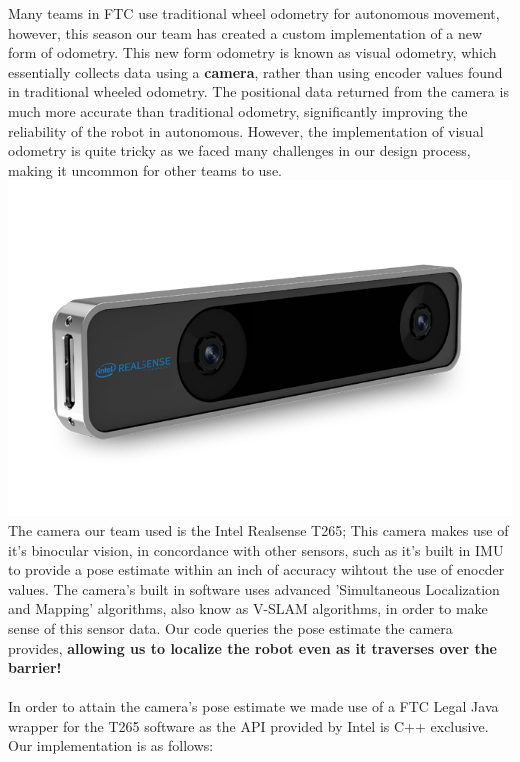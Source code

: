 \documentclass[a4paper,12pt]{article}
\begin{document}
\noindent Many teams in FTC use traditional wheel odometry for autonomous movement, however, this season our team has created a custom implementation of a new form of odometry. This new form odometry is known as visual odometry, which essentially collects data using a \textbf{camera}, rather than using encoder values found in traditional wheeled odometry. The positional data returned from the camera is much more accurate than traditional odometry, significantly improving the reliability of the robot in autonomous. However, the implementation of visual odometry is quite tricky as we faced many challenges in our design process, making it uncommon for other teams to use. 
\\
\includegraphics[width=\textwidth]{t265.png}
The camera our team used is the Intel Realsense T265; This camera makes use of it's binocular vision, in concordance with other sensors, such as it's built in IMU to provide a pose estimate within an inch of accuracy wihtout the use of enocder values. The camera's built in software uses advanced 'Simultaneous Localization and Mapping' algorithms, also know as V-SLAM algorithms, in order to make sense of this sensor data. Our code queries the pose estimate the camera provides, \textbf{allowing us to localize the robot even as it traverses over the barrier!}
\\
\\
In order to attain the camera's pose estimate we made use of a FTC Legal Java wrapper for the T265 software as the API provided by Intel is C++ exclusive. Our implementation is as follows:
\\
\end{document}
